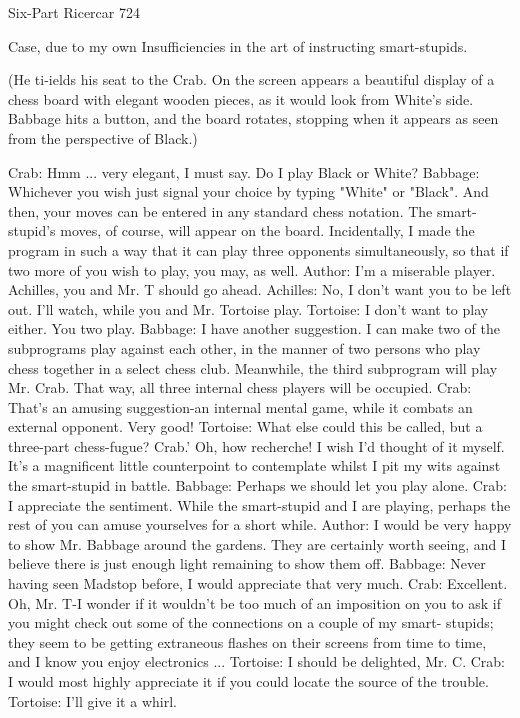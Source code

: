 Six-Part Ricercar                                                                        724

Case, due to my own Insufficiencies in the art of instructing smart-stupids.

   (He ti-ields his seat to the Crab. On the screen appears a beautiful display of a chess
   board with elegant wooden pieces, as it would look from White's side. Babbage hits a
   button, and the board rotates, stopping when it appears as seen from the perspective
   of Black.)

Crab: Hmm ... very elegant, I must say. Do I play Black or White?
Babbage: Whichever you wish just signal your choice by typing "White" or "Black". And
  then, your moves can be entered in any standard chess notation. The smart-stupid's
  moves, of course, will appear on the board. Incidentally, I made the program in such a
  way that it can play three opponents simultaneously, so that if two more of you wish to
  play, you may, as well.
Author: I'm a miserable player. Achilles, you and Mr. T should go ahead. Achilles: No, I
  don't want you to be left out. I'll watch, while you and Mr. Tortoise play.
Tortoise: I don't want to play either. You two play.
Babbage: I have another suggestion. I can make two of the subprograms play against
  each other, in the manner of two persons who play chess together in a select chess
  club. Meanwhile, the third subprogram will play Mr. Crab. That way, all three internal
  chess players will be occupied.
Crab: That's an amusing suggestion-an internal mental game, while it combats an external
  opponent. Very good!
Tortoise: What else could this be called, but a three-part chess-fugue?
Crab.' Oh, how recherche! I wish I'd thought of it myself. It's a magnificent little
  counterpoint to contemplate whilst I pit my wits against the smart-stupid in battle.
Babbage: Perhaps we should let you play alone.
Crab: I appreciate the sentiment. While the smart-stupid and I are playing, perhaps the
  rest of you can amuse yourselves for a short while.
Author: I would be very happy to show Mr. Babbage around the gardens. They are
  certainly worth seeing, and I believe there is just enough light remaining to show them
  off.
Babbage: Never having seen Madstop before, I would appreciate that very much.
Crab: Excellent. Oh, Mr. T-I wonder if it wouldn't be too much of an imposition on you
  to ask if you might check out some of the connections on a couple of my smart-
  stupids; they seem to be getting extraneous flashes on their screens from time to time,
  and I know you enjoy electronics ...
Tortoise: I should be delighted, Mr. C.
Crab: I would most highly appreciate it if you could locate the source of the trouble.
Tortoise: I'll give it a whirl.




